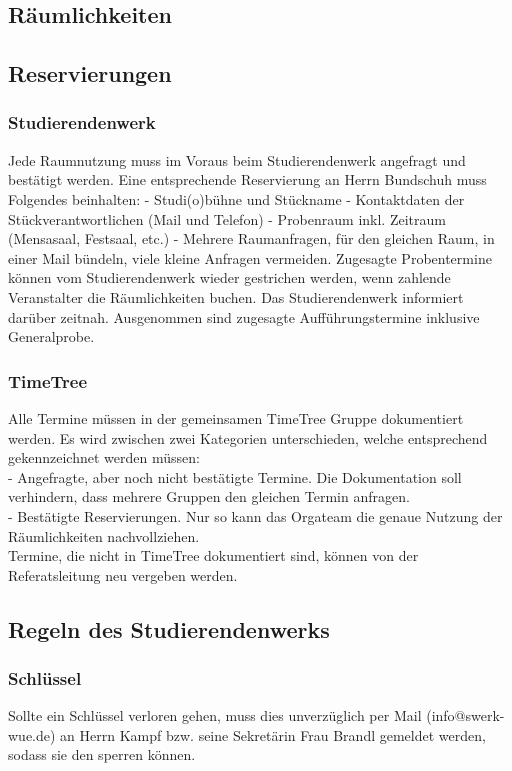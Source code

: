 \subsection{Räumlichkeiten}

\subsection{Reservierungen}
\subsubsection{Studierendenwerk}
Jede Raumnutzung muss im Voraus beim Studierendenwerk angefragt und bestätigt werden. Eine entsprechende Reservierung an Herrn Bundschuh muss Folgendes beinhalten:
- Studi(o)bühne und Stückname
- Kontaktdaten der Stückverantwortlichen (Mail und Telefon)
- Probenraum inkl. Zeitraum (Mensasaal, Festsaal, etc.) 
- Mehrere Raumanfragen, für den gleichen Raum, in einer Mail bündeln, viele kleine Anfragen vermeiden.
Zugesagte Probentermine können vom Studierendenwerk wieder gestrichen werden, wenn zahlende Veranstalter die Räumlichkeiten buchen. Das Studierendenwerk informiert darüber zeitnah. Ausgenommen sind zugesagte Aufführungstermine inklusive Generalprobe.	

\subsubsection{TimeTree}
Alle Termine müssen in der gemeinsamen TimeTree Gruppe dokumentiert werden. Es wird zwischen zwei Kategorien unterschieden, welche entsprechend gekennzeichnet werden müssen:	\\
- Angefragte, aber noch nicht bestätigte Termine. Die Dokumentation soll verhindern, dass mehrere Gruppen den gleichen Termin anfragen.\\
- Bestätigte Reservierungen. Nur so kann das Orgateam die genaue Nutzung der Räumlichkeiten nachvollziehen. \\
Termine, die nicht in TimeTree dokumentiert sind, können von der Referatsleitung neu vergeben werden.

\subsection{Regeln des Studierendenwerks}
\subsubsection{Schlüssel}
Sollte ein Schlüssel verloren gehen, muss dies unverzüglich per Mail (info@swerk-wue.de) an Herrn Kampf bzw. seine Sekretärin Frau Brandl gemeldet werden, sodass sie den sperren können. 

